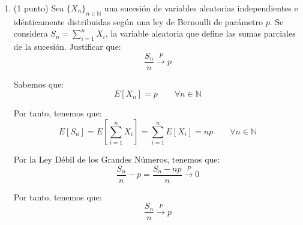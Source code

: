 \documentclass[12pt]{article}
\begin{document}
\begin{ejercicio}[1.5 puntos]
\begin{enumerate}
            \item (1 punto) Sea $\{X_n\}_{n \in \mathbb{N}}$ una sucesión de variables aleatorias independientes e idénticamente distribuidas según una ley de Bernoulli de parámetro $p$. Se considera $S_n = \sum\limits_{i=1}^n X_i$, la variable aleatoria que define las sumas parciales de la sucesión. Justificar que: $$\frac{S_n}{n} \xrightarrow{P} p$$
            
            Sabemos que:
            \begin{equation*}
                E[X_n] = p\qquad \forall n \in \mathbb{N}
            \end{equation*}

            Por tanto, tenemos que:
            \begin{equation*}
                E[S_n] = E\left[\sum_{i=1}^n X_i\right] = \sum_{i=1}^n E[X_i] = np\qquad \forall n \in \mathbb{N}
            \end{equation*}
            
            Por la Ley Débil de los Grandes Números, tenemos que:
            \begin{equation*}
                \frac{S_n}{n}-p = \frac{S_n-np}{n} \xrightarrow{P} 0
            \end{equation*}

            Por tanto, tenemos que:
            \begin{equation*}
                \frac{S_n}{n} \xrightarrow{P} p
            \end{equation*}
        \end{enumerate}
    \end{ejercicio}
\end{document}

